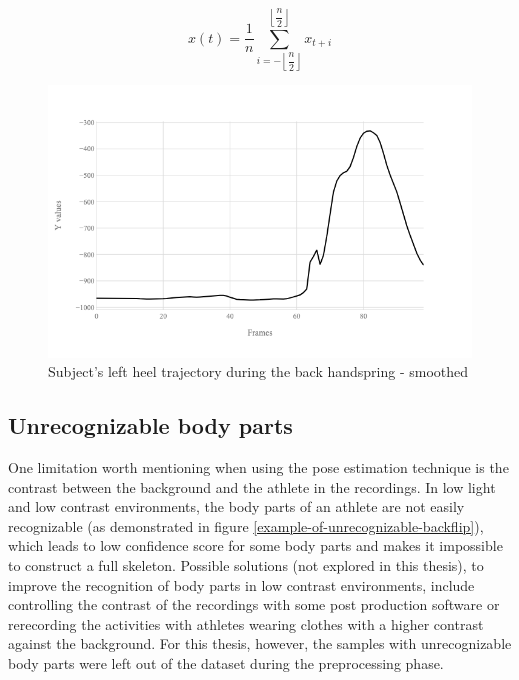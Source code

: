 \begin{equation}
\label{moving-average-smoothing-formula}
x(t) = \dfrac{1}{n}\sum\limits_{i=-\left\lfloor{\dfrac{n}{2}}\right\rfloor}^{\left\lfloor{\dfrac{n}{2}}\right\rfloor}x_{t+i}
\end{equation}

\begin{figure}[htb]
  \centering
    \includegraphics[width=\textwidth,keepaspectratio]
    {images/data-preprocessing/flack-17-rasmus-l-heel-y-smoothed}
    \caption{Subject's left heel trajectory during the back handspring - smoothed}
    \label{lack-17-rasmus-l-heel-y-smoothed}
\end{figure}

\subsection{Unrecognizable body parts}

One limitation worth mentioning when using the pose estimation technique is the contrast between the background and the athlete in the recordings. In low light and low contrast environments, the body parts of an athlete are not easily recognizable (as demonstrated in figure \ref{example-of-unrecognizable-backflip}), which leads to low confidence score for some body parts and makes it impossible to construct a full skeleton. Possible solutions (not explored in this thesis), to improve the recognition of body parts in low contrast environments, include controlling the contrast of the recordings with some post production software or rerecording the activities with athletes wearing clothes with a higher contrast against the background. For this thesis, however, the samples with unrecognizable body parts were left out of the dataset during the preprocessing phase.

